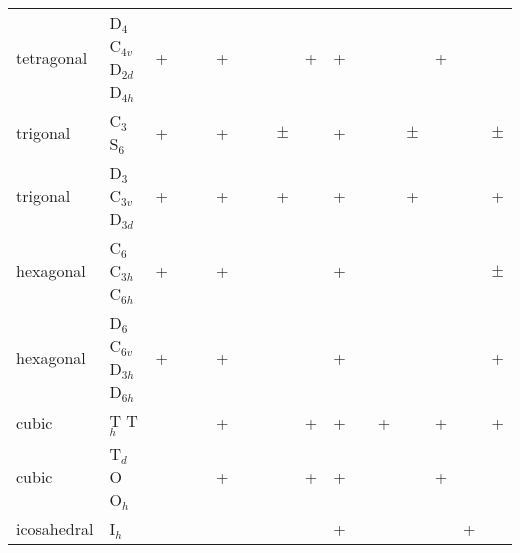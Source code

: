 \begin{landscape}
\begin{table}
\begin{tabular}{lllllllllllllllll}
tetragonal & D$_{4}$ C$_{4v}$ D$_{2d}$ D$_{4h}$ &+      &       & &+      &       &       &       &+      &+      &       &       & &+      &       &       \\
trigonal   & C$_{3}$ S$_{6}$                    &+      &       & &+      &       &       &$\pm$  &       &+      &       &       &$\pm$&      &       &$\pm$  \\
trigonal   & D$_{3}$ C$_{3v}$ D$_{3d}$          &+      &       & &+      &       &       &+      &       &+      &       &       &+ &       &       &+      \\
hexagonal  & C$_{6}$ C$_{3h}$ C$_{6h}$          &+      &       & &+      &       &       &       &       &+      &       &       & &       &       &$\pm$  \\
hexagonal  & D$_{6}$ C$_{6v}$ D$_{3h}$ D$_{6h}$ &+      &       & &+      &       &       &       &       &+      &       &       & &       &       &+      \\
cubic      & T         T$_{h}$                  &       &       & &+      &       &       &       &+      &+      &       &+      & &+      &       &+      \\
cubic      &   T$_{d}$  O O$_{h}$               &       &       & &+      &       &       &       &+      &+      &       &       & &+      &       &       \\
icosahedral & I$_h$                             &       &       & &       &       &       &       &       &+      &       &       & &       &+      &       \\
\end{tabular}
\end{table}


\end{landscape}
